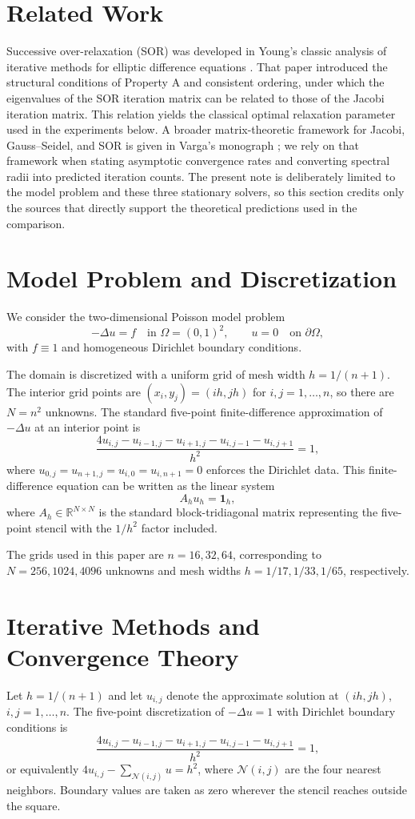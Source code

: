 \documentclass[11pt]{article}
\begin{document}
\section{Related Work}
Successive over-relaxation (SOR) was developed in Young's classic analysis of iterative methods for elliptic difference equations \cite{young1954iterative}. That paper introduced the structural conditions of Property A and consistent ordering, under which the eigenvalues of the SOR iteration matrix can be related to those of the Jacobi iteration matrix. This relation yields the classical optimal relaxation parameter used in the experiments below. A broader matrix-theoretic framework for Jacobi, Gauss--Seidel, and SOR is given in Varga's monograph \cite{varga1962matrix}; we rely on that framework when stating asymptotic convergence rates and converting spectral radii into predicted iteration counts. The present note is deliberately limited to the model problem and these three stationary solvers, so this section credits only the sources that directly support the theoretical predictions used in the comparison.
\section{Model Problem and Discretization}
We consider the two-dimensional Poisson model problem
\[
-\Delta u = f \quad \text{in } \Omega=(0,1)^2, \qquad u=0 \quad \text{on } \partial\Omega,
\]
with $f\equiv 1$ and homogeneous Dirichlet boundary conditions.

The domain is discretized with a uniform grid of mesh width $h=1/(n+1)$. The interior grid points are $(x_i,y_j)=(ih,jh)$ for $i,j=1,\dots,n$, so there are $N=n^2$ unknowns. The standard five-point finite-difference approximation of $-\Delta u$ at an interior point is
\[
\frac{4u_{i,j}-u_{i-1,j}-u_{i+1,j}-u_{i,j-1}-u_{i,j+1}}{h^2}=1,
\]
where $u_{0,j}=u_{n+1,j}=u_{i,0}=u_{i,n+1}=0$ enforces the Dirichlet data. This finite-difference equation can be written as the linear system
\[
A_h u_h = \mathbf{1}_h,
\]
where $A_h\in\mathbb{R}^{N\times N}$ is the standard block-tridiagonal matrix representing the five-point stencil with the $1/h^2$ factor included.

The grids used in this paper are $n=16,32,64$, corresponding to $N=256,1024,4096$ unknowns and mesh widths $h=1/17,1/33,1/65$, respectively.
\section{Iterative Methods and Convergence Theory}
Let $h=1/(n+1)$ and let $u_{i,j}$ denote the approximate solution at $(ih,jh)$, $i,j=1,\dots,n$. The five-point discretization of $-\Delta u=1$ with Dirichlet boundary conditions is
\[
\frac{4u_{i,j}-u_{i-1,j}-u_{i+1,j}-u_{i,j-1}-u_{i,j+1}}{h^2}=1,
\]
or equivalently $4u_{i,j}-\sum_{\mathcal{N}(i,j)}u=h^2$, where $\mathcal{N}(i,j)$ are the four nearest neighbors. Boundary values are taken as zero wherever the stencil reaches outside the square.
\end{document}
